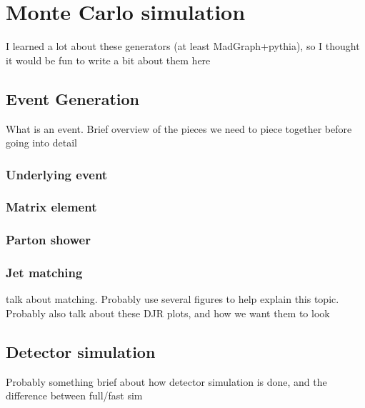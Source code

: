 \chapter[Monte Carlo simulation][Monte Carlo simulation]{Monte Carlo simulation}

{\color{red} I learned a lot about these generators (at least MadGraph+pythia),
  so I thought it would be fun to write a bit about them here}

\section{Event Generation}

{\color{red} What is an event. Brief overview of the pieces we need to piece
  together before going into detail}

\subsection{Underlying event}

\subsection{Matrix element}

\subsection{Parton shower}

\subsection{Jet matching}

{\color{red} talk about matching. Probably use several figures to help explain
  this topic. Probably also talk about these DJR plots, and how we want them
  to look}

\section{Detector simulation}

{\color{red} Probably something brief about how detector simulation is done, and
  the difference between full/fast sim}

